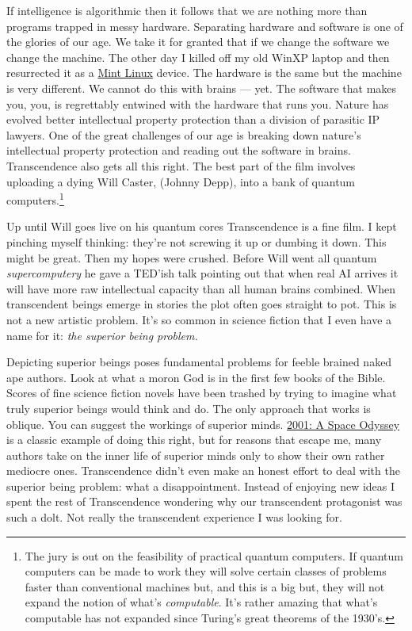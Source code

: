 If intelligence is algorithmic then it follows that we are nothing more
than programs trapped in messy hardware. Separating hardware and
software is one of the glories of our age. We take it for granted that
if we change the software we change the machine. The other day I killed
off my old WinXP laptop and then resurrected it as a
\href{http://www.linuxmint.com/}{Mint Linux} device. The hardware is the
same but the machine is very different. We cannot do this with brains
--- yet. The software that makes you, you, is regrettably entwined with
the hardware that runs you. Nature has evolved better intellectual
property protection than a division of parasitic IP lawyers. One of the
great challenges of our age is breaking down nature's intellectual
property protection and reading out the software in brains.
Transcendence also gets all this right. The best part of the film
involves uploading a dying Will Caster, (Johnny Depp), into a bank of
quantum computers.\footnote{
The jury is out on the feasibility of practical quantum
computers. If quantum computers can be made to work they will solve
certain classes of problems faster than conventional machines but, and
this is a big but, they will not expand the notion of what's
\emph{computable}. It's rather amazing that what's computable has not
expanded since Turing's great theorems of the 1930's.
}

Up until Will goes live on his quantum cores Transcendence is a fine
film. I kept pinching myself thinking: they're not screwing it up or
dumbing it down. This might be great. Then my hopes were crushed.
Before Will went all quantum \emph{supercomputery} he gave a TED'ish
talk pointing out that when real AI arrives it will have more raw
intellectual capacity than all human brains combined. When transcendent
beings emerge in stories the plot often goes straight to pot. This is
not a new artistic problem. It's so common in science fiction that I
even have a name for it: \emph{the superior being problem.}

Depicting superior beings poses fundamental problems for feeble brained
naked ape authors. Look at what a moron God is in the first few books of
the Bible. Scores of fine science fiction novels have been trashed by
trying to imagine what truly superior beings would think and do. The
only approach that works is oblique. You can suggest the workings of
superior minds. \href{http://www.imdb.com/title/tt0062622/}{2001: A
Space Odyssey} is a classic example of doing this right, but for reasons
that escape me, many authors take on the inner life of superior minds
only to show their own rather mediocre ones. Transcendence didn't even
make an honest effort to deal with the superior being
problem: what a disappointment. Instead of enjoying new ideas I spent
the rest of Transcendence wondering why our transcendent protagonist was
such a dolt. Not really the transcendent experience I was looking for.



